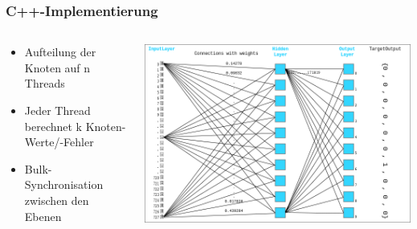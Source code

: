 \documentclass[xcolor=pdftex,dvipsnames,table]{beamer}
\begin{document}
	\begin{frame}
		\frametitle{C++-Implementierung}
		\begin{columns}
			\begin{column}{0.5\textwidth}
				\begin{itemize}
					\item Aufteilung der Knoten auf n Threads
					\item Jeder Thread berechnet k Knoten-Werte/-Fehler
					\item Bulk-Synchronisation zwischen den Ebenen
				\end{itemize}
			\end{column}
			\begin{column}{0.6\textwidth}
				\includegraphics[width=1\textwidth]{nn.png}
			\end{column}
		\end{columns}
	\end{frame}
\end{document}
